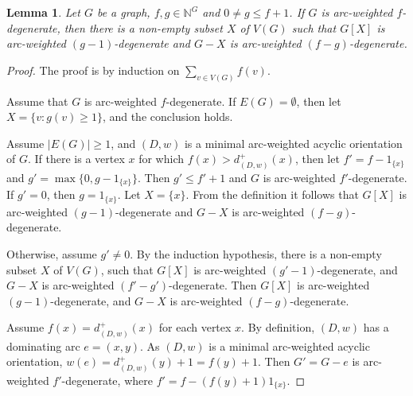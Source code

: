 \documentclass[11pt,a4paper]{article}
\newtheorem{lem}{Lemma}
\theoremstyle{definition}
\newcommand{\xztodo}[1]{\todo[color=yellow]{XZ: #1}}
\begin{document}
   
		\begin{lem}
			\label{lem-1}
			Let $G$ be a graph, $f,g \in \mathbb{N}^G$ and $0 \ne g \le f+1$. If $G$ is arc-weighted  $f$-degenerate, then  there is a non-empty subset $X$ of $V(G)$ such that $G[X]$ is arc-weighted  $(g-1)$-degenerate and $G-X$ is arc-weighted $(f-g)$-degenerate. 
		\end{lem}
		\begin{proof}
	The proof is by induction on $\sum_{v \in V(G)}f(v)$. 

 
 Assume that $G$ is arc-weighted $f$-degenerate. 
 If $E(G)=\emptyset$, then let $X=\{v: g(v)  \ge 1\}$, and the conclusion holds.  
 
  Assume $|E(G)| \ge 1$, and $(D,w)$ is a  minimal arc-weighted   acyclic orientation of $G$. If there is a vertex $x$ for which  
$f(x) > d_{(D,w)}^+(x)$, 
then let $f'=f-1_{\{x\}}$ and $g' = \max\{0, g- 1_{\{x\}}\}$. Then $g' \le f'+1$ and $G$ is arc-weighted  $f'$-degenerate. If $g'=0$, then $g=1_{\{x\}}$.  
  Let $X=\{x\}$. From the definition it follows that $G[X]$ is arc-weighted $(g-1)$-degenerate and $G-X$ is arc-weighted $(f-g)$-degenerate. 

   Otherwise, assume $g' \neq 0$. By the induction hypothesis,  there is a non-empty  subset $X$ of $V(G)$, such that $G[X]$ is arc-weighted   $(g'-1)$-degenerate, and $G-X$ is arc-weighted   $(f'-g')$-degenerate. Then $G[X]$ is arc-weighted  $(g-1)$-degenerate, and $G-X$ is arc-weighted $(f-g)$-degenerate.

Assume $f(x) = d_{(D,w)}^+(x)$ for each vertex $x$. 
By definition, $(D,w)$ has a dominating arc $e=(x,y)$.  As $(D,w)$ is a  minimal arc-weighted   acyclic orientation,  $w(e) = d_{(D,w)}^+(y)+1 =f(y)+1$.
Then $G'=G-e$ is  arc-weighted   $f'$-degenerate, where $f'=f-(f(y)+1)1_{\{x\}}$.
 


\end{proof}
\end{document}
